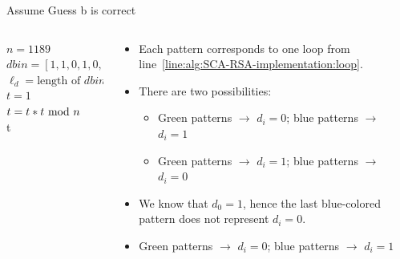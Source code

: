 \begin{frame}{Assume Guess b is correct}
   \begin{columns}[T] %
\begin{column}{.48\textwidth}
{
\setlength{\interspacetitleruled}{0pt}%
\setlength{\algotitleheightrule}{0pt}%
\begin{algorithm}[H]
$n=1189$\\
$dbin=[1,1,0,1,0,1,1,1,0,1]$\\
$\ell_d=\text{length of }dbin$\\
$t = 1$\\
 	{
  	$t=t*t\textrm{~mod~} n$\label{line:alg:SCA-RSA-implementation:tt}\\
  	}
  	\Return t
\end{algorithm}
}
\end{column}%
\hfill%
\begin{column}{.57\textwidth}
\begin{itemize}
   \item[Guess b] Each pattern corresponds to one loop from line~\ref{line:alg:SCA-RSA-implementation:loop}.
\item There are two possibilities:
\begin{itemize}
    \item Green patterns $\rightarrow$ $d_i=0$; blue patterns $\rightarrow$ $d_i=1$ 
    \item Green patterns $\rightarrow$ $d_i=1$; blue patterns $\rightarrow$ $d_i=0$ 
\end{itemize}
    \item We know that $d_0=1$, hence the last blue-colored pattern does not represent $d_i=0$.
    \item Green patterns $\rightarrow$ $d_i=0$; blue patterns $\rightarrow$ $d_i=1$ 
\end{itemize}
\end{column}%
\end{columns} 
\end{frame}

